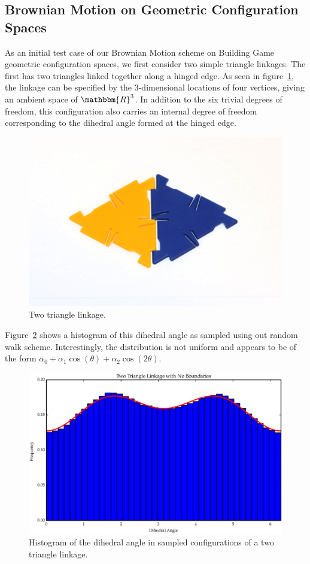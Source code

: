 \subsection{Brownian Motion on Geometric Configuration Spaces}
\label{ssc:MBMGCS}
As an initial test case of our Brownian Motion scheme on Building Game geometric configuration spaces, we first consider two simple triangle linkages. The first has two triangles linked together along a hinged edge. As seen in figure~\ref{fig:T2_diagram}, the linkage can be specified by the $3$-dimensional locations of four vertices, giving an ambient space of $\mathbbm{R}^3$. In addition to the six trivial degrees of freedom, this configuration also carries an internal degree of freedom corresponding to the dihedral angle formed at the hinged edge. 
\begin{figure}[ht]
\centering
  \includegraphics[scale=0.1]{images/T2_diagram.eps}
\caption{Two triangle linkage.}
\label{fig:T2_diagram}
\end{figure}
Figure~\ref{fig:T2_1} shows a histogram of this dihedral angle as sampled using out random walk scheme. Interestingly, the distribution is not uniform and appears to be of the form $\alpha_0 + \alpha_1\cos(\theta) + \alpha_2\cos(2\theta)$. 
\begin{figure}[ht]
\centering
  \includegraphics[scale=0.6]{images/T2_1.eps}
\caption{Histogram of the dihedral angle in sampled configurations of a two triangle linkage.}
\label{fig:T2_1}
\end{figure}

